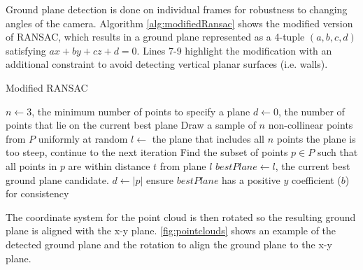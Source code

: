 Ground plane detection is done on individual frames for robustness to changing
angles of the camera.
Algorithm \autoref{alg:modifiedRansac} shows the modified version of RANSAC,
which results in a ground plane represented as a 4-tuple $(a,b,c,d)$ satisfying
$ax + by + cz + d = 0$. Lines 7-9 highlight the modification with an additional
constraint to avoid detecting vertical planar surfaces (i.e. walls).


\begin{algorithm}
\caption{Modified RANSAC}
\label{alg:modifiedRansac}
\begin{algorithmic}[1]
\Statex
{}
    \State $n \gets 3$, the minimum number of points to specify a plane
    \State $d \gets 0$, the number of points that lie on the current best plane
        \State Draw a sample of $n$ non-collinear points from $P$ uniformly at random
        \State $l \gets$ the plane that includes all $n$ points
            \State the plane is too steep, continue to the next iteration
        \EndIf
        \State Find the subset of points $p \in P$ such that all points in $p$ are
        within distance $t$ from plane $l$
            \State $bestPlane \gets l$, the current best ground plane candidate.
            \State $d \gets |p|$
        \EndIf
    \EndFor
    \State ensure $bestPlane$ has a positive $y$ coefficient ($b$) for consistency
\EndFunction
\Statex
{}
\end{algorithmic}
\end{algorithm}

The coordinate system for the point cloud is then rotated so the resulting
ground plane is aligned with the x-y plane. \autoref{fig:pointclouds} shows an
example of the detected ground plane and the rotation to align the ground plane
to the x-y plane.

